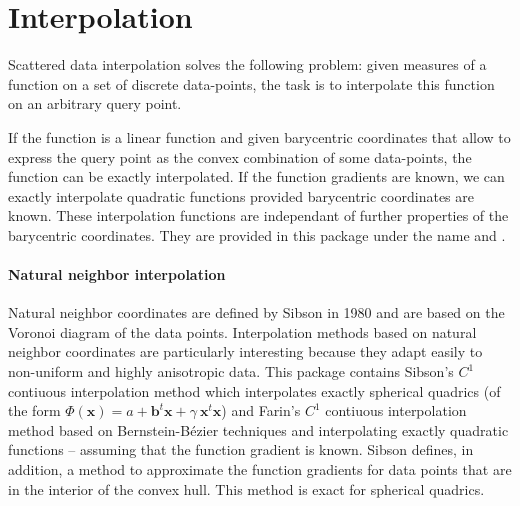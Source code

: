 
\chapter{Interpolation}
\label{chap:Interpolation}

Scattered data interpolation solves the following problem: given
measures of a function on a set of discrete data-points, the task is
to interpolate this function on an arbitrary query point.

If the function is a linear function and given barycentric coordinates
that allow to express the query point as the convex combination of
some data-points, the function can be exactly interpolated. If the
function gradients are known, we can exactly interpolate quadratic
functions provided barycentric coordinates are known. These interpolation
functions are independant of further properties of the barycentric
coordinates. They are provided in this package under the name
 and .\medskip

\subsubsection{Natural neighbor interpolation} Natural neighbor
coordinates are defined by Sibson in 1980 and are based on the Voronoi
diagram of the data points. Interpolation methods based on natural
neighbor coordinates are particularly interesting because they adapt
easily to non-uniform and highly anisotropic data.  This package
contains Sibson's $C^1$ contiuous interpolation method which
interpolates exactly spherical quadrics (of the form $\Phi(\mathbf{x})
=a + \mathbf{b}^t \mathbf{x} +\gamma\ \mathbf{x}^t\mathbf{x}$) and
Farin's $C^1$ contiuous interpolation method based on
Bernstein-B\'ezier techniques and interpolating exactly quadratic
functions -- assuming that the function gradient is known. Sibson
defines, in addition, a method to approximate the function gradients
for data points that are in the interior of the convex hull. This
method is exact for spherical quadrics.%

